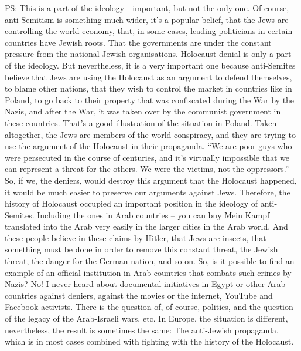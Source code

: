 PS: This is a part of the ideology - important, but not the only one. Of course, anti-Semitism is something much wider, it’s a popular belief, that the Jews are controlling the world economy, that, in some cases, leading politicians in certain countries have Jewish roots. That the governments are under the constant pressure from the national Jewish organisations. Holocaust denial is only a part of the ideology. But nevertheless, it is a very important one because anti-Semites believe that Jews are using the Holocaust as an argument to defend themselves, to blame other nations, that they wish to control the market in countries like in Poland, to go back to their property that was confiscated during the War by the Nazis, and after the War, it was taken over by the communist government in these countries. That’s a good illustration of the situation in Poland. Taken altogether, the Jews are members of the world conspiracy, and they are trying to use the argument of the Holocaust in their propaganda. “We are poor guys who were persecuted in the course of centuries, and it’s virtually impossible that we can represent a threat for the others. We were the victims, not the oppressors.” So, if we, the deniers, would destroy this argument that the Holocaust happened, it would be much easier to preserve our arguments against Jews. Therefore, the history of Holocaust occupied an important position in the ideology of anti-Semites. Including the ones in Arab countries – you can buy Mein Kampf translated into the Arab very easily in the larger cities in the Arab world. And these people believe in these claims by Hitler, that Jews are insects, that something must be done in order to remove this constant threat, the Jewish threat, the danger for the German nation, and so on. So, is it possible to find an example of an official institution in Arab countries that combats such crimes by Nazis? No! I never heard about documental initiatives in Egypt or other Arab countries against deniers, against the movies or the internet, YouTube and Facebook activists. There is the question of, of course, politics, and the question of the legacy of the Arab-Israeli wars, etc. In Europe, the situation is different, nevertheless, the result is sometimes the same: The anti-Jewish propaganda, which is in most cases combined with fighting with the history of the Holocaust. 
